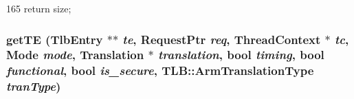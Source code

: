 \begin{DoxyCode}
165 { return size; }
\end{DoxyCode}
\hypertarget{classArmISA_1_1TLB_acdb1ef6fa70ed231ff084dced51b91eb}{
\subsubsection[{getTE}]{ getTE ({\bf TlbEntry} $\ast$$\ast$ {\em te}, \/  {\bf RequestPtr} {\em req}, \/  {\bf ThreadContext} $\ast$ {\em tc}, \/  {\bf Mode} {\em mode}, \/  {\bf Translation} $\ast$ {\em translation}, \/  bool {\em timing}, \/  bool {\em functional}, \/  bool {\em is\_\-secure}, \/  {\bf TLB::ArmTranslationType} {\em tranType})}}
\label{classArmISA_1_1TLB_acdb1ef6fa70ed231ff084dced51b91eb}



